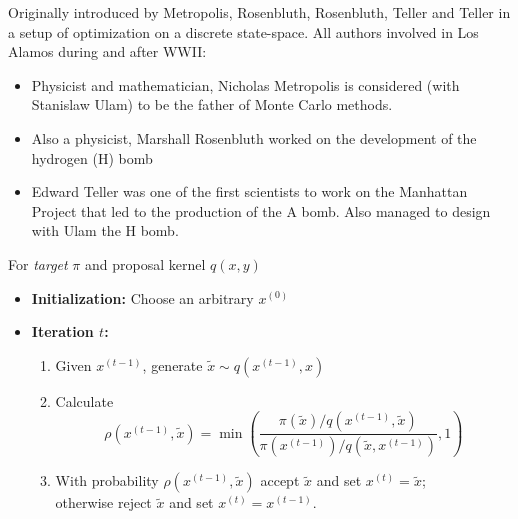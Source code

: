 \begin{slide}
\end{slide}\begin{slide}

Originally introduced by Metropolis, Rosenbluth, Rosenbluth, Teller and Teller
in a setup of optimization on a discrete state-space.  All authors involved in Los Alamos during and after WWII:
\pause\small
\begin{itemize}
\item Physicist and mathematician, Nicholas Metropolis is considered (with Stanislaw Ulam) to be the father
of Monte Carlo methods. 
\item Also a physicist, Marshall Rosenbluth worked on the development of the hydrogen (H) bomb 
\item Edward Teller was one of the first scientists to work on the Manhattan Project
that led to the production of the A bomb. Also managed to design with Ulam the H bomb.
\end{itemize}\normalsize

\end{slide}\begin{slide}

For {\em target} $\pi$ and proposal kernel $q(x,y)$

\begin{block}{\sffamily
\begin{itemize}
\small
\item[ ] {\bfseries Initialization:} Choose an arbitrary $x^{(0)}$
\pause
\item[ ] {\bfseries Iteration $t$:} 
\normalsize
\begin{enumerate}
\item Given $x^{(t-1)}$, generate $\tilde x \sim q(x^{(t-1)},x)$
\item Calculate 
$$
\rho(x^{(t-1)},\tilde x)=\min\left(\frac{\pi(\tilde x)/q(x^{(t-1)},\tilde x)}{\pi(x^{(t-1)})/q(\tilde x,x^{(t-1)})},1\right)
$$
\item  With probability $\rho(x^{(t-1)},\tilde x)$ accept $\tilde x$ and set $x^{(t)}=\tilde x$;\\
otherwise reject $ \tilde x$ and set $x^{(t)}=x^{(t-1)}$.
\end{enumerate}
\end{itemize}
}\end{block}

\end{slide}\begin{slide}


\end{slide}
